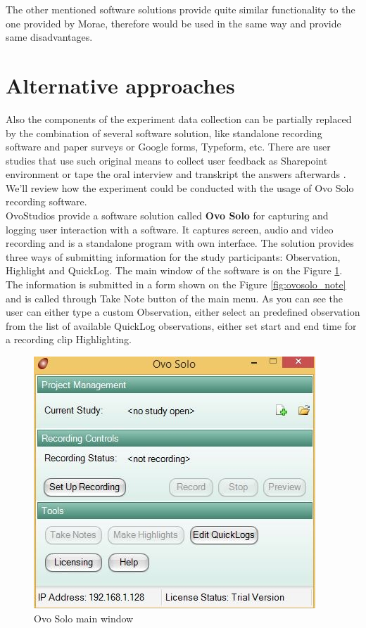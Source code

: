 The other mentioned software solutions provide quite similar functionality to the one provided by Morae, therefore would be used in the same way and provide same disadvantages.

\section{Alternative approaches}\label{section:alternative}

Also the components of the experiment data collection can be partially replaced by the combination of several software solution, like standalone recording software and paper surveys or Google forms, Typeform, etc. There are user studies that use such original means to collect user feedback as Sharepoint environment \cite{chp} or tape the oral interview and transkript the answers afterwards \cite{Kuhn2012}. We'll review  how the experiment could be conducted with the usage of Ovo Solo recording software.\\

OvoStudios provide a software solution called \textbf{Ovo Solo} for capturing and logging user interaction with a software. It captures screen, audio and video recording and is a standalone program with own interface. The solution provides three ways of submitting information for the study participants: Observation, Highlight and QuickLog. The main window of the software is on the Figure \ref{fig:ovosolo_main}. The information is submitted in a form shown on the Figure \ref{fig:ovosolo_note} and is called through Take Note button of the main menu. As you can see the user can either type a custom Observation, either select an predefined observation from the list of available QuickLog observations, either set start and end time for a recording clip Highlighting. \\ 

 \begin{figure}[htb]
 \centering
\includegraphics{figures/ovosolo_main.jpg}
\caption{Ovo Solo main window}
\label{fig:ovosolo_main}
 \end{figure}
 
